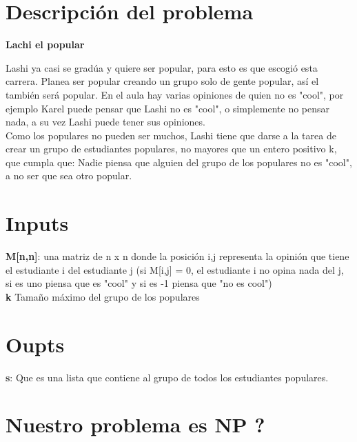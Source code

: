 \documentclass[sn-mathphys,Numbered]{sn-jnl}%
\theoremstyle{thmstyleone}%
\theoremstyle{thmstyletwo}%
\theoremstyle{thmstylethree}%
\begin{document}


\maketitle

\section{Descripci\'on del problema}\label{sec1}

\begin{center}
    \textbf{Lachi el popular}
\end{center} 

Lashi ya casi se gradúa y quiere ser popular, para esto es que escogió esta carrera. Planea ser popular creando un grupo solo de gente popular, así el también será popular. En el aula hay varias opiniones de quien no es "cool", por ejemplo Karel puede pensar que Lashi no es "cool", o simplemente no pensar nada, a su vez Lashi puede tener sus opiniones.\\

Como los populares no pueden ser muchos, Lashi tiene que darse a la tarea de crear un grupo de estudiantes populares, no mayores que un entero positivo k, que cumpla que: Nadie piensa que alguien del grupo de los populares no es "cool", a no ser que sea otro popular.

\section*{Inputs}
\textbf{M[n,n]}: una matriz de n x n donde la posición i,j representa la opinión que tiene el estudiante i del estudiante j (si M[i,j] = 0, el estudiante i no opina nada del j, si es uno piensa que es "cool" y si es -1 piensa que "no es cool")\\
\textbf{k} Tama\~no máximo del grupo de los populares
\section*{Oupts}
\textbf{s}: Que es una lista que contiene al grupo de todos los estudiantes populares.

\section*{Nuestro problema es NP ?}
\end{document}
